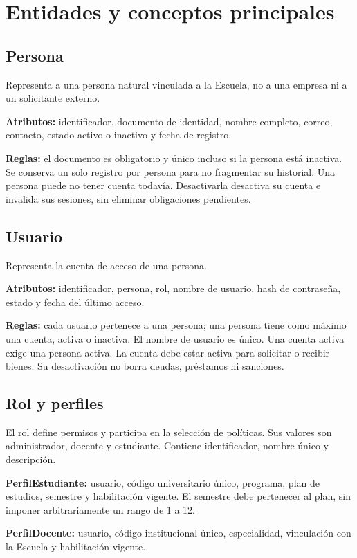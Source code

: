 \section{Entidades y conceptos principales}
\label{sec:entidades}

\subsection{Persona}
Representa a una persona natural vinculada a la Escuela, no a una empresa ni a un solicitante externo.

\textbf{Atributos:} identificador, documento de identidad, nombre completo, correo, contacto, estado activo o inactivo y fecha de registro.

\textbf{Reglas:} el documento es obligatorio y \'unico incluso si la persona est\'a inactiva. Se conserva un solo registro por persona para no fragmentar su historial. Una persona puede no tener cuenta todav\'ia. Desactivarla desactiva su cuenta e invalida sus sesiones, sin eliminar obligaciones pendientes.

\subsection{Usuario}
Representa la cuenta de acceso de una persona.

\textbf{Atributos:} identificador, persona, rol, nombre de usuario, hash de contrase\~na, estado y fecha del \'ultimo acceso.

\textbf{Reglas:} cada usuario pertenece a una persona; una persona tiene como m\'aximo una cuenta, activa o inactiva. El nombre de usuario es \'unico. Una cuenta activa exige una persona activa. La cuenta debe estar activa para solicitar o recibir bienes. Su desactivaci\'on no borra deudas, pr\'estamos ni sanciones.

\subsection{Rol y perfiles}
El rol define permisos y participa en la selecci\'on de pol\'iticas. Sus valores son administrador, docente y estudiante. Contiene identificador, nombre \'unico y descripci\'on.

\textbf{PerfilEstudiante:} usuario, c\'odigo universitario \'unico, programa, plan de estudios, semestre y habilitaci\'on vigente. El semestre debe pertenecer al plan, sin imponer arbitrariamente un rango de 1 a 12.

\textbf{PerfilDocente:} usuario, c\'odigo institucional \'unico, especialidad, vinculaci\'on con la Escuela y habilitaci\'on vigente.

